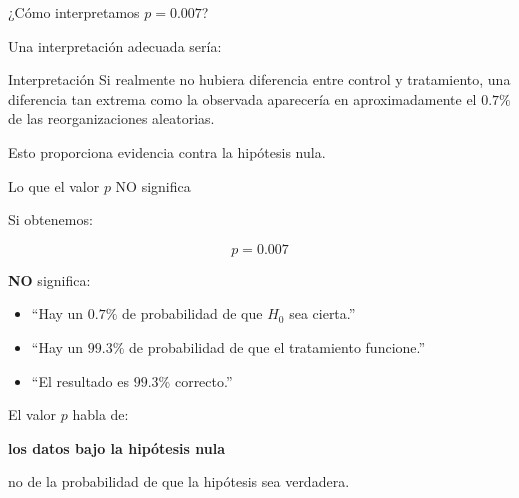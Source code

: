 \documentclass[11pt, aspectratio=169]{beamer}
\begin{document}
\begin{frame}{¿Cómo interpretamos $p=0.007$?}

Una interpretación adecuada sería:

\vspace{0.4cm}

\begin{alertblock}{Interpretación}
Si realmente no hubiera diferencia entre control y tratamiento,
una diferencia tan extrema como la observada aparecería en
aproximadamente el $0.7\%$ de las reorganizaciones aleatorias.
\end{alertblock}

\vspace{0.5cm}

Esto proporciona evidencia contra la hipótesis nula.

\end{frame}

\begin{frame}{Lo que el valor $p$ NO significa}

Si obtenemos:

\[
p=0.007
\]

\textbf{NO} significa:

\begin{itemize}
    \item ``Hay un $0.7\%$ de probabilidad de que $H_0$ sea cierta.''
    \item ``Hay un $99.3\%$ de probabilidad de que el tratamiento funcione.''
    \item ``El resultado es $99.3\%$ correcto.''
\end{itemize}

\vspace{0.4cm}

El valor $p$ habla de:

\begin{center}
\Large
\textbf{los datos bajo la hipótesis nula}
\end{center}

no de la probabilidad de que la hipótesis sea verdadera.

\end{frame}
\end{document}
